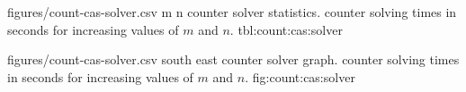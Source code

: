 \vfill

\SolverStatsTable
  {figures/count-cas-solver.csv}
  {m n}
  {\CountRowHeader}
  { counter solver statistics.}
  { counter solving times in seconds for increasing values of $m$ and $n$.}
  {tbl:count:cas:solver}

\SolverStatsGraph
  {figures/count-cas-solver.csv}
  {south east}
  { counter solver graph.}
  { counter solving times in seconds for increasing values of $m$ and $n$.}
  {fig:count:cas:solver}
